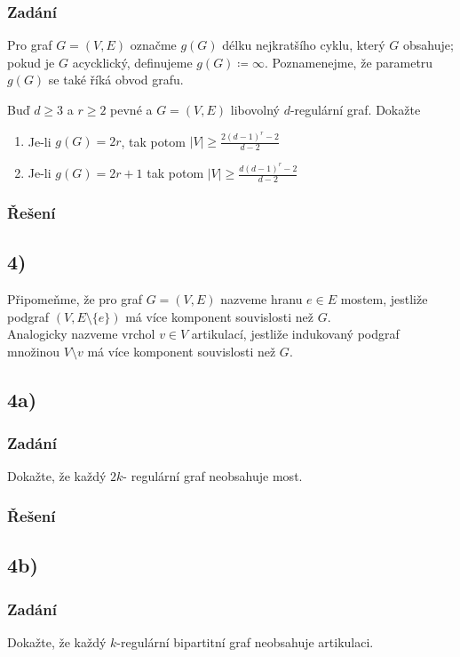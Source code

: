 \documentclass[../main.tex]{subfiles}
\begin{document}
\subsubsection*{Zadání}
Pro graf $G=(V,E)$ označme $g(G)$ délku nejkratšího cyklu, který $G$ obsahuje; pokud je $G$ acycklický, definujeme $g(G)\coloneq \infty$.
Poznamenejme, že parametru $g(G)$ se také říká obvod grafu.

Buď $d\geq 3$ a $r\geq 2$ pevné a $G=(V,E)$ libovolný $d$-regulární graf. Dokažte
\begin{enumerate}
    \item Je-li $g(G)=2r$, tak  potom $|V| \geq \frac{2(d-1)^r -2}{d-2}$
    \item Je-li $g(G) = 2r + 1$ tak potom $|V|\geq \frac{d(d-1)^r -2}{d-2}$
\end{enumerate}

\subsubsection*{Řešení}


\subsection*{4)}
Připomeňme, že pro graf $G=(V,E)$ nazveme hranu $e\in E$ mostem, jestliže podgraf $(V,E\setminus\{e\})$ má více komponent souvislosti než $G$.\\
Analogicky nazveme vrchol $v\in V$ artikulací, jestliže indukovaný podgraf množinou $V\setminus{v}$ má více komponent souvislosti než $G$.

\subsection*{4a)}
\subsubsection*{Zadání}
Dokažte, že každý $2k$- regulární graf neobsahuje most.



\subsubsection*{Řešení}


\subsection*{4b)}
\subsubsection*{Zadání}
Dokažte, že každý $k$-regulární bipartitní graf neobsahuje artikulaci.
\end{document}

